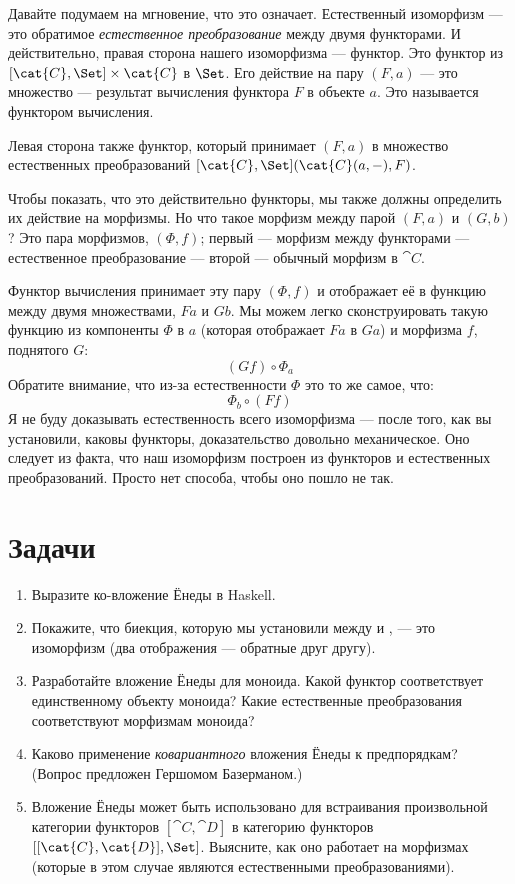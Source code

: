 Давайте подумаем на мгновение, что это означает. Естественный изоморфизм --- это
обратимое \emph{естественное преобразование} между двумя функторами. И
действительно, правая сторона нашего изоморфизма --- функтор. Это
функтор из $[\cat{C}, \Set] \times \cat{C}$ в $\Set$. Его действие на
пару $(F, a)$ --- это множество --- результат вычисления
функтора $F$ в объекте $a$. Это называется
функтором вычисления.

Левая сторона также функтор, который принимает $(F, a)$ в
множество естественных преобразований $[\cat{C}, \Set](\cat{C}(a, -), F)$.

Чтобы показать, что это действительно функторы, мы также должны определить их
действие на морфизмы. Но что такое морфизм между парой
$(F, a)$ и $(G, b)$? Это пара морфизмов,
$(\Phi, f)$; первый --- морфизм между функторами ---
естественное преобразование --- второй --- обычный морфизм в
$\cat{C}$.

Функтор вычисления принимает эту пару $(\Phi, f)$ и отображает её в
функцию между двумя множествами, $F a$ и $G b$. Мы можем
легко сконструировать такую функцию из компоненты $\Phi$ в
$a$ (которая отображает $F a$ в $G a$) и морфизма
$f$, поднятого $G$:
\[(G f) \circ \Phi_a\]
Обратите внимание, что из-за естественности $\Phi$ это то же самое, что:
\[\Phi_b \circ (F f)\]
Я не буду доказывать естественность всего изоморфизма --- после того,
как вы установили, каковы функторы, доказательство довольно
механическое. Оно следует из факта, что наш изоморфизм построен
из функторов и естественных преобразований. Просто нет способа, чтобы оно
пошло не так.

\section{Задачи}

\begin{enumerate}
  \tightlist
  \item
        Выразите ко-вложение Ёнеды в Haskell.
  \item
        Покажите, что биекция, которую мы установили между  и
        , --- это изоморфизм (два отображения --- обратные
        друг другу).
  \item
        Разработайте вложение Ёнеды для моноида. Какой функтор соответствует
        единственному объекту моноида? Какие естественные преобразования соответствуют
        морфизмам моноида?
  \item
        Каково применение \emph{ковариантного} вложения Ёнеды к
        предпорядкам? (Вопрос предложен Гершомом Базерманом.)
  \item
        Вложение Ёнеды может быть использовано для встраивания произвольной категории функторов
        $[\cat{C}, \cat{D}]$ в категорию функторов
        $[[\cat{C}, \cat{D}], \Set]$. Выясните, как оно работает на морфизмах
        (которые в этом случае являются естественными преобразованиями).
\end{enumerate}
